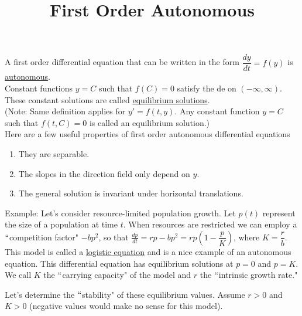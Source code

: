 \documentclass{ximera}
\begin{document}
\begin{abstract}
 \end{abstract}

    \title{First Order Autonomous}
    
    \maketitle


 A first order differential equation that can be written in the form $\dfrac{dy}{dt}=f(y)$ is \underline{autonomous}.\\

 Constant functions $y=C$ such that $f(C)=0$ satisfy the de on $(-\infty,\infty)$. These constant solutions are called \underline{equilibrium solutions}.\\

  (Note:  Same definition applies for $y'=f(t,y)$.  Any constant function $y=C$ such that $f(t,C)=0$ is called an equilibrium solution.)\\


  Here are a few useful properties of first order autonomous differential equations

 \begin{enumerate}

\item They are separable.
\item The slopes in the direction field only depend on $y$.
\item The general solution is invariant under horizontal translations.\\

 \end{enumerate}


 Example:  Let's consider resource-limited population growth.  Let $p(t)$ represent the size of a population at time $t$.  When resources are restricted we can employ a $``$competition factor" $-bp^{2}$, so that $\displaystyle \frac{dp}{dt}=rp-bp^{2}=rp\left(1-\dfrac{p}{K}\right)$, where $K=\dfrac{r}{b}$.\\

 This model is called a \underline{logistic equation} and is a nice example of an autonomous equation.  This differential equation has equilibrium solutions at $p=0$ and $p=K$.  We call $K$ the $``$carrying capacity" of the model and $r$ the $``$intrinsic growth rate."

\newpage

 Let's determine the $``$stability" of these equilibrium values.  Assume $r>0$ and $K>0$ (negative values would make no sense for this model).\\
\end{document}
